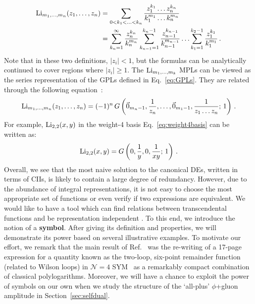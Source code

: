 \documentclass[main.tex]{subfiles}
\begin{document}
\begin{subequations}
\begin{align} \label{eq:multiLidefinition}
    \text{Li}_{m_1, \ldots, m_n}(z_1, \ldots, z_n) &= \sum_{0<k_1<\ldots<k_n} \frac{z_1^{k_1} \ldots z_n^{k_n}}{k_1^{m_1} \ldots k_n^{m_n}} \\
    &= \sum_{k_n=1}^\infty \frac{z_n^{k_n}}{k_n^{m_n}} \sum_{k_{n-1}=1}^{k_n-1} \frac{z_{n-1}^{k_{n-1}}}{k_{n-1}^{m_{n-1}}}\ldots \sum_{k_1=1}^{k_2-1} \frac{z_1^{k_1}}{k_1^{m_1}}\,. \label{eq:multiLidefinition2}
\end{align}
\end{subequations}
Note that in these two definitions, $|z_i|<1$, but the formulas can be analytically continued to cover regions where $|z_i| \ge 1$. The $\text{Li}_{m_1, \ldots, m_k}$ MPLs can be viewed as the series representation of the GPLs defined in Eq.~\ref{eq:GPLs}. They are related through the following equation~\cite{Duhr:2011zq}:
\begin{equation} \label{eq:LiToG}
    \text{Li}_{m_1, \ldots, m_n}(z_1, \ldots, z_n) = (-1)^n\,G\left(\vec{0}_{m_n-1}, \frac{1}{z_n}, \ldots, \vec{0}_{m_1-1}, \frac{1}{z_1\ldots z_n}; \,1 \right)\,.
\end{equation}
For example, $\text{Li}_{2,2}(x, y)$ in the weight-4 basis Eq.~\ref{eq:weight4basis} can be written as:%
\begin{equation}
     \text{Li}_{2,2}(x, y) = G\left(0, \frac{1}{y}, 0, \frac{1}{xy};\,1 \right)\,.
\end{equation}
Overall, we see that the most naive solution to the canonical DEs, written in terms of CIIs, is likely to contain a large degree of redundancy. However, due to the abundance of integral representations, it is not easy to choose the most appropriate set of functions or even verify if two expressions are equivalent. We would like to have a tool which can find relations between transcendental functions and be representation independent . To this end, we introduce the notion of a \textbf{symbol}\cite{Goncharov:2010jf, Duhr:2011zq}. After giving its definition and properties, we will demonstrate its power based on several illustrative examples. To motivate our effort, we remark that the main result of Ref.~\cite{Goncharov:2010jf} was the re-writing of a 17-page expression for a quantity known as the two-loop, six-point remainder function (related to Wilson loops) in $\mathcal{N}=4$ SYM~\cite{DelDuca:2009au, DelDuca:2010zg} as a remarkably compact combination of classical polylogarithms. Moreover, we will have a chance to exploit the power of symbols on our own when we study the structure of the `all-plus' $\phi$+gluon amplitude in Section~\ref{sec:selfdual}.
\end{document}
